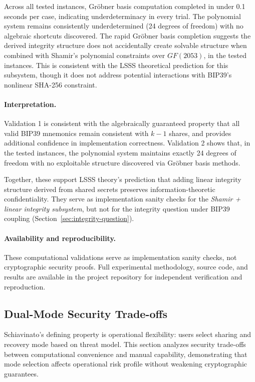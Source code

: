\documentclass[11pt]{article}
\begin{document}
Across all tested instances, Gröbner basis computation completed in under 0.1 seconds per case, indicating underdeterminacy in every trial. The polynomial system remains consistently underdetermined (24 degrees of freedom) with no algebraic shortcuts discovered. The rapid Gröbner basis completion suggests the derived integrity structure does not accidentally create solvable structure when combined with Shamir's polynomial constraints over $GF(2053)$, in the tested instances. This is consistent with the LSSS theoretical prediction for this subsystem, though it does not address potential interactions with BIP39's nonlinear SHA-256 constraint.

\paragraph{Interpretation.} Validation 1 is consistent with the algebraically guaranteed property that all valid BIP39 mnemonics remain consistent with $k-1$ shares, and provides additional confidence in implementation correctness. Validation 2 shows that, in the tested instances, the polynomial system maintains exactly 24 degrees of freedom with no exploitable structure discovered via Gröbner basis methods.

Together, these support LSSS theory's prediction that adding linear integrity structure derived from shared secrets preserves information-theoretic confidentiality. They serve as implementation sanity checks for the \textit{Shamir + linear integrity subsystem}, but not for the integrity question under BIP39 coupling (Section~\ref{sec:integrity-question}).

\paragraph{Availability and reproducibility.} These computational validations serve as implementation sanity checks, not cryptographic security proofs. Full experimental methodology, source code, and results are available in the project repository for independent verification and reproduction.

\subsection{Dual-Mode Security Trade-offs}

Schiavinato's defining property is operational flexibility: users select sharing and recovery mode based on threat model. This section analyzes security trade-offs between computational convenience and manual capability, demonstrating that mode selection affects operational risk profile without weakening cryptographic guarantees.
\end{document}
